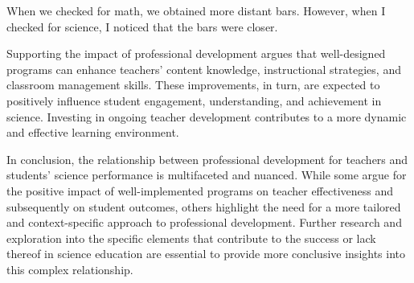 \documentclass[
  letterpaper,
  DIV=11,
  numbers=noendperiod]{scrreprt}
\newenvironment{Shaded}{\begin{snugshade}}{\end{snugshade}}
\begin{document}
\begin{Shaded}
\begin{Highlighting}[]

\end{Highlighting}
\end{Shaded}

When we checked for math, we obtained more distant bars. However, when I
checked for science, I noticed that the bars were closer.

Supporting the impact of professional development argues that
well-designed programs can enhance teachers' content knowledge,
instructional strategies, and classroom management skills. These
improvements, in turn, are expected to positively influence student
engagement, understanding, and achievement in science. Investing in
ongoing teacher development contributes to a more dynamic and effective
learning environment.

In conclusion, the relationship between professional development for
teachers and students' science performance is multifaceted and nuanced.
While some argue for the positive impact of well-implemented programs on
teacher effectiveness and subsequently on student outcomes, others
highlight the need for a more tailored and context-specific approach to
professional development. Further research and exploration into the
specific elements that contribute to the success or lack thereof in
science education are essential to provide more conclusive insights into
this complex relationship.
\end{document}
